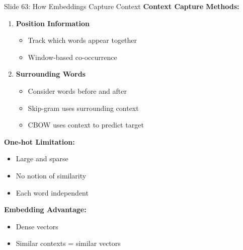 \documentclass[8pt]{beamer}
\begin{document}
	\begin{frame}{Slide 63: How Embeddings Capture Context}
		\fontsize{6.5}{7.5}\selectfont
		\textbf{Context Capture Methods:}
		\begin{enumerate}
			\item \textbf{Position Information}
			\begin{itemize}
				\item Track which words appear together
				\item Window-based co-occurrence
			\end{itemize}
			\item \textbf{Surrounding Words}
			\begin{itemize}
				\item Consider words before and after
				\item Skip-gram uses surrounding context
				\item CBOW uses context to predict target
			\end{itemize}
		\end{enumerate}
		
		\vspace{0.1cm}
		\textbf{One-hot Limitation:}
		\begin{itemize}
			\item Large and sparse
			\item No notion of similarity
			\item Each word independent
		\end{itemize}
		
		\textcolor{myblue}{\textbf{Embedding Advantage:}}
		\begin{itemize}
			\item Dense vectors
			\item Similar contexts = similar vectors
		\end{itemize}
	\end{frame}
	
\end{document}
